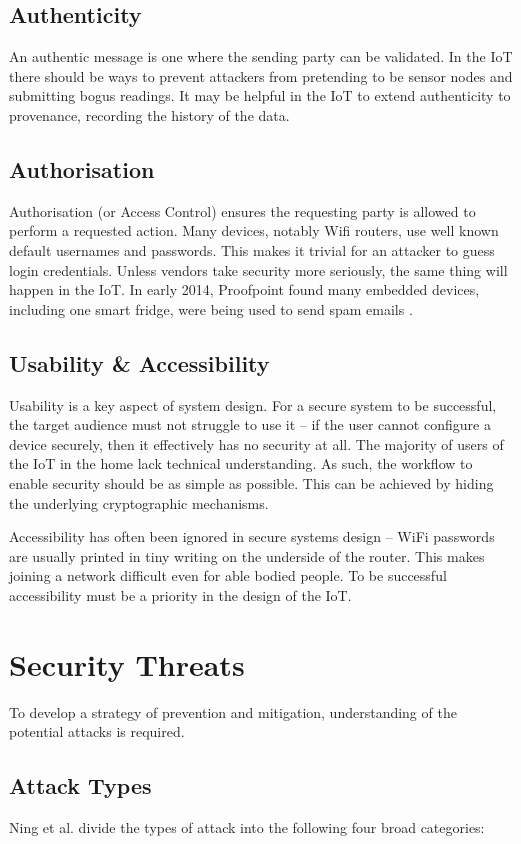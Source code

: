 \documentclass[10pt,journal,compsoc]{IEEEtran}
\begin{document}
\subsection{Authenticity}
An authentic message is one where the sending party can be validated. In the
IoT there should be ways to prevent attackers from pretending to be sensor
nodes and submitting bogus readings. It may be helpful in the IoT to extend
authenticity to provenance, recording the history of the data.

\subsection{Authorisation}
Authorisation (or Access Control) ensures the requesting party is allowed to
perform a requested action. Many devices, notably Wifi routers, use well known
default usernames and passwords. This makes it trivial for an attacker to guess
login credentials. Unless vendors take security more seriously, the same thing
will happen in the IoT. In early 2014, Proofpoint found many embedded devices,
including one smart fridge, were being used to send spam emails
\cite{Proofpoint2014}. 

\subsection{Usability \& Accessibility}
Usability is a key aspect of system design. For a secure system to be
successful, the target audience must not struggle to use it -- if the user
cannot configure a device securely, then it effectively has no security at all.
The majority of users of the IoT in the home lack technical understanding. As
such, the workflow to enable security should be as simple as possible. This can
be achieved by hiding the underlying cryptographic mechanisms. 

Accessibility has often been ignored in secure systems design -- WiFi passwords
are usually printed in tiny writing on the underside of the router. This makes
joining a network difficult even for able bodied people. To be successful
accessibility must be a priority in the design of the IoT.


\section{Security Threats}
To develop a strategy of prevention and mitigation, understanding of the
potential attacks is required.  

\subsection{Attack Types}
Ning et al. \cite{Ning2013} divide the types of attack into the following
four broad categories:
\end{document}
